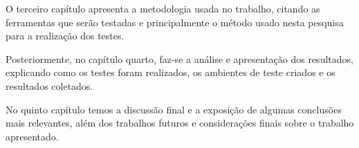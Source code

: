 O terceiro capítulo apresenta a metodologia usada no trabalho, citando as ferramentas que serão testadas e principalmente o método usado nesta pesquisa para a realização dos testes. 

Posteriormente, no capítulo quarto, faz-se a análise e apresentação dos resultados, explicando como os testes foram realizados, os ambientes de teste criados e os resultados coletados.

No quinto capítulo temos a discussão final e a exposição de algumas conclusões mais relevantes, além dos trabalhos futuros e considerações finais sobre o trabalho apresentado.


%
%
%


